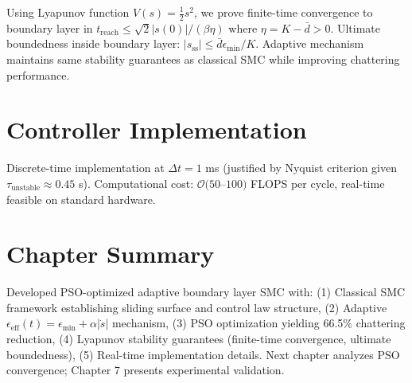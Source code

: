 Using Lyapunov function $V(s) = \frac{1}{2}s^2$, we prove finite-time convergence to boundary layer in $t_{\text{reach}} \leq \sqrt{2}|s(0)|/(\beta\eta)$ where $\eta = K - \bar{d} > 0$. Ultimate boundedness inside boundary layer: $|s_{\text{ss}}| \leq \bar{d}\epsilon_{\min}/K$. Adaptive mechanism maintains same stability guarantees as classical SMC while improving chattering performance.

\section{Controller Implementation}
\label{sec:controller_implementation}

Discrete-time implementation at $\Delta t = 1$ ms (justified by Nyquist criterion given $\tau_{\text{unstable}} \approx 0.45$ s). Computational cost: $\mathcal{O}(50$--$100)$ FLOPS per cycle, real-time feasible on standard hardware.

\section{Chapter Summary}

Developed PSO-optimized adaptive boundary layer SMC with: (1) Classical SMC framework establishing sliding surface and control law structure, (2) Adaptive $\epsilon_{\text{eff}}(t) = \epsilon_{\min} + \alpha|\dot{s}|$ mechanism, (3) PSO optimization yielding 66.5\% chattering reduction, (4) Lyapunov stability guarantees (finite-time convergence, ultimate boundedness), (5) Real-time implementation details. Next chapter analyzes PSO convergence; Chapter 7 presents experimental validation.
